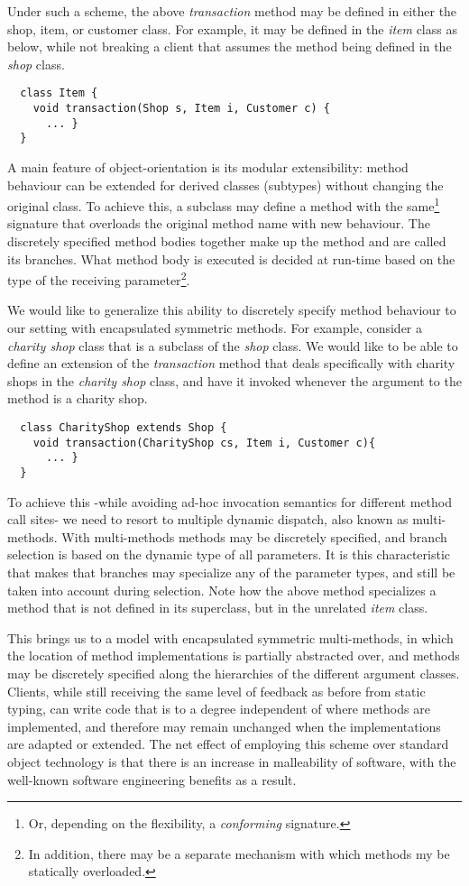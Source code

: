 \documentclass[11pt]{article}
\begin{document}
Under such a scheme, the above \emph{transaction} method may be defined in either the shop, item, or customer class. For example, it may be defined in the \emph{item} class as below, while not breaking a client that assumes the method being defined in the \emph{shop} class. 
\begin{verbatim}
  class Item {
    void transaction(Shop s, Item i, Customer c) {
      ... }
  }
\end{verbatim}

A main feature of object-orientation is its modular extensibility: method behaviour can be extended for derived classes (subtypes) without changing the original class. To achieve this, a subclass may define a method with the same\footnote{Or, depending on the flexibility, a \emph{conforming} signature.} signature that overloads the original method name with new behaviour. The discretely specified method bodies together make up the method and are called its branches. What method body is executed is decided at run-time based on the type of the receiving parameter\footnote{In addition, there may be a separate mechanism with which methods my be statically overloaded.}. 

We would like to generalize this ability to discretely specify method behaviour to our setting with encapsulated symmetric methods. For example, consider a \emph{charity shop} class that is a subclass of the \emph{shop} class. We would like to be able to define an extension of the \emph{transaction} method that deals specifically with charity shops in the \emph{charity shop} class, and have it invoked whenever the argument to the method is a charity shop. 
\begin{verbatim}
  class CharityShop extends Shop {
    void transaction(CharityShop cs, Item i, Customer c){
      ... }
  }
\end{verbatim}
To achieve this -while avoiding ad-hoc invocation semantics for different method call sites- we need to resort to multiple dynamic dispatch, also known as multi-methods. With multi-methods methods may be discretely specified, and branch selection is based on the dynamic type of all parameters. It is this characteristic that makes that branches may specialize any of the parameter types, and still be taken into account during selection. Note how the above method specializes a method that is not defined in its superclass, but in the unrelated \emph{item} class.

This brings us to a model with encapsulated symmetric multi-methods, in which the location of method implementations is partially abstracted over, and methods may be discretely specified along the hierarchies of the different argument classes. Clients, while still receiving the same level of feedback as before from static typing, can write code that is to a degree independent of where methods are implemented, and therefore may remain unchanged when the implementations are adapted or extended. The net effect of employing this scheme over standard object technology is that there is an increase in malleability of software, with the well-known software engineering benefits as a result. 
\end{document}
